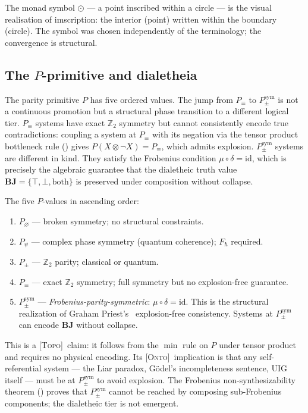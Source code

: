 \documentclass[12pt,a4paper]{article}
\newcommand{\Ppms}{P_{\pm}^{\text{sym}}}
\newcommand{\tensor}{\otimes}
\newcommand{\TOPO}{\textsc{[Topo]}}
\newcommand{\ONTO}{\textsc{[Onto]}}
\newcommand{\glp}{\text{LP}}
\newcommand{\both}{\mathbf{BJ}}
\begin{document}
The monad symbol $\odot$ --- a point inscribed within a circle --- is
the visual realisation of imscription: the interior (point) written
within the boundary (circle). The symbol was chosen independently of
the terminology; the convergence is structural.

\subsection{The $P$-primitive and dialetheia}
\label{sec:p_dialetheia}

The parity primitive $P$ has five ordered values. The jump from
$P_\equiv$ to $\Ppms$ is not a continuous promotion but a structural
phase transition to a different logical tier. $P_\equiv$ systems have
exact $\mathbb{Z}_2$ symmetry but cannot consistently encode true
contradictions: coupling a system at $P_\equiv$ with its negation
via the tensor product bottleneck rule () gives
$P(X \tensor \neg X) = P_\equiv$, which admits explosion. $\Ppms$
systems are different in kind. They satisfy the Frobenius condition
$\mu \circ \delta = \text{id}$, which is precisely the algebraic
guarantee that the dialetheic truth value $\both = \{\top, \bot,
\text{both}\}$ is preserved under composition without collapse.

The five $P$-values in ascending order:
\begin{enumerate}[leftmargin=*, label=\arabic*.]
  \item $P_\varnothing$ --- broken symmetry; no structural constraints.
  \item $P_\psi$ --- complex phase symmetry (quantum coherence); $F_\hbar$ required.
  \item $P_\pm$ --- $\mathbb{Z}_2$ parity; classical or quantum.
  \item $P_\equiv$ --- exact $\mathbb{Z}_2$ symmetry; full symmetry
    but no explosion-free guarantee.
  \item $\Ppms$ --- \emph{Frobenius-parity-symmetric}: $\mu \circ \delta
    = \text{id}$. This is the structural realization of Graham Priest's
    \glp\ explosion-free consistency. Systems at $\Ppms$ can encode
    $\both$ without collapse.
\end{enumerate}

\noindent
This is a \TOPO\ claim: it follows from the $\min$ rule on $P$ under
tensor product and requires no physical encoding. Its
\ONTO\ implication is that any self-referential system --- the Liar
paradox, G\"{o}del's incompleteness sentence, UIG itself --- must be
at $\Ppms$ to avoid explosion. The Frobenius non-synthesizability theorem
() proves that $\Ppms$ cannot be reached by composing
sub-Frobenius components; the dialetheic tier is not emergent.
\end{document}
